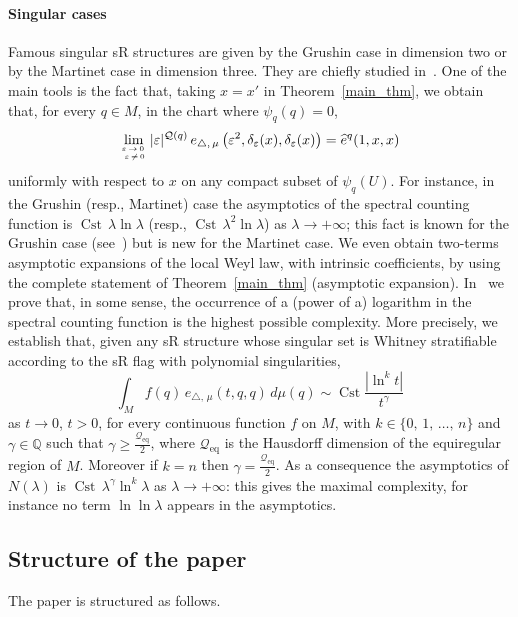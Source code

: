 \documentclass[AHL,Unicode,published]{cedram}
\newcommand*\Q{\mathbb{Q}}
\newcommand{\calQ}{\mathcal{Q}}
\DeclareMathOperator{\Cst}{Cst}
\newcommand{\Qeq}{\mathcal{Q}_\mathrm{eq}}
\renewcommand{\geq}{\geqslant}
\begin{document}
\paragraph{Singular cases}
Famous singular sR structures are given by the Grushin case in dimension two or by the Martinet case in dimension three. They are chiefly studied in~\cite{CHT-II}. One of the main tools is the fact that, taking $x=x'$ in Theorem~\ref{main_thm}, we obtain that, for every $q\in M$, in the chart where $\psi_{q}(q)=0$,
\begin{equation*}
\lim_{\varepsilon\,\rightarrow\, 0\,\atop\, \varepsilon\,\neq\, 0} \vert\varepsilon\vert^{\calQ(q)}\, e_{\triangle,\,\mu}\left(\varepsilon^2,\delta_\varepsilon(x),\delta_\varepsilon(x)\right) = \widehat{e}^{q}(1,x,x)
\end{equation*}
uniformly with respect to $x$ on any compact subset of $\psi_{q}(U)$. For instance, in the Grushin (resp., Martinet) case the asymptotics of the spectral counting function is $\Cst\, \lambda\ln\lambda$ (resp., $\Cst\,\lambda^2\ln\lambda$) as $\lambda\rightarrow+\infty$; this fact is known for the Grushin case (see~\cite{Me-Sj-78}) but is new for the Martinet case. We even obtain two-terms asymptotic expansions of the local Weyl law, with intrinsic coefficients, by using the complete statement of Theorem~\ref{main_thm} (asymptotic expansion). In~\cite{CHT-II} we prove that, in some sense, the occurrence of a (power of a) logarithm in the spectral counting function is the highest possible complexity. More precisely, we establish that, given any sR structure whose singular set is Whitney stratifiable according to the sR flag with polynomial singularities,
\[
\int_M f(q)\, e_{\triangle,\,\mu}(t,q,q) \, d\mu (q) \sim \Cst \frac{\left\vert\ln^k t\right\vert}{t^\gamma}
\]
as $t\rightarrow 0$, $t>0$, for every continuous function $f$ on $M$, with $k\in\{0,\,1,\,\ldots,\,n\}$ and $\gamma\in\Q$ such that $\gamma\geq \frac{\Qeq}{2}$, where $\Qeq$ is the Hausdorff dimension of the equiregular region of $M$. Moreover if $k=n$ then $\gamma=\frac{\Qeq}{2}$. As a consequence the asymptotics of $N(\lambda)$ is $\Cst\,\lambda^\gamma\ln^k\lambda$ as $\lambda\rightarrow +\infty$: this gives the maximal complexity, for instance no term $\ln\ln\lambda$ appears in the asymptotics.


\subsection{Structure of the paper}
The paper is structured as follows.
\end{document}
